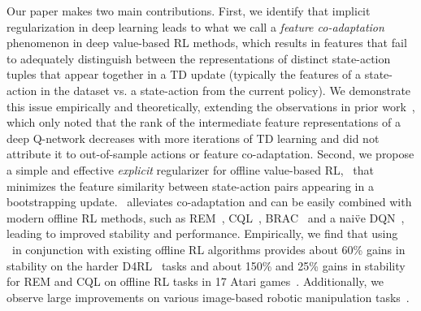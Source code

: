 Our paper makes two main contributions. First, we identify that implicit regularization in deep learning leads to what we call a \emph{feature co-adaptation} phenomenon
in deep value-based RL methods, which results in features that fail to adequately distinguish between the representations of distinct state-action tuples that appear together in a TD update (typically the features of a state-action in the dataset vs. a state-action from the current policy).
We demonstrate this issue empirically and theoretically, extending the observations in prior work~\citep{kumar2021implicit}, which only noted that the rank of the intermediate feature representations of a deep Q-network decreases with more iterations of TD learning and did not attribute it to out-of-sample actions or feature co-adaptation.
Second, we propose a simple and effective \emph{explicit} regularizer for offline value-based RL, \methodname\ that minimizes the feature similarity between state-action pairs appearing in a bootstrapping update. \methodname\ alleviates co-adaptation and can be easily combined with modern offline RL methods, such as REM~\citep{agarwal2019optimistic}, CQL~\citep{kumar2020conservative}, BRAC~\citep{brac} and a nai\"ve DQN~\citep{mnih2013playing}, leading to improved stability and performance. Empirically, we find that using \methodname\ in conjunction with existing offline RL algorithms provides about 60\% gains in stability on the harder D4RL~\citep{fu2020d4rl} tasks and about 150\% and 25\% gains in stability for REM and CQL on offline RL tasks in 17 Atari games~\citep{agarwal2019optimistic}. Additionally, we observe large improvements on various image-based robotic manipulation tasks~\citep{singh2020cog}.


